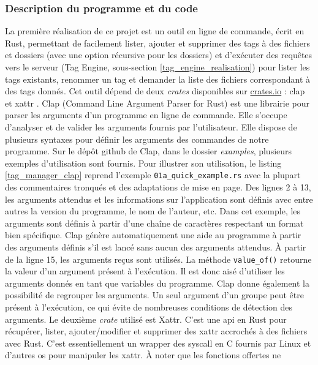 \documentclass[a4paper, 12pt]{article}
\begin{document}
\subsubsection{Description du programme et du code}
La première réalisation de ce projet est un outil en ligne de commande, écrit en Rust, permettant 
de facilement lister, ajouter et supprimer des tags à des fichiers et dossiers (avec une option 
récursive pour les dossiers) et d'exécuter des requêtes vers le serveur (Tag Engine, sous-section 
\ref{tag_engine_realisation}) pour lister 
les tags existants, renommer un tag et demander la liste des fichiers correspondant à des tags 
donnés. Cet outil dépend de deux \textit{crates} disponibles sur \href{https://crates.io}{crates.io} 
: clap \cite{ref22} et xattr \cite{ref23}.
\bigbreak
Clap (Command Line Argument Parser for Rust) est une 
librairie pour parser les arguments d'un programme en ligne de commande. Elle s'occupe d'analyser 
et de valider les arguments fournis par l'utilisateur. Elle dispose de plusieurs syntaxes pour 
définir les arguments des commandes de notre programme. Sur le dépôt github de Clap, dans le 
dossier \textit{examples}, plusieurs exemples d'utilisation sont fournis. Pour illustrer son 
utilisation, le listing \ref{tag_manager_clap} reprend l'exemple \texttt{01a_quick_example.rs} 
avec la plupart des commentaires tronqués et des adaptations de mise en page. Des lignes 2 à 13, 
les arguments attendus et les informations sur l'application sont définis avec entre autres la 
version du programme, le nom de l'auteur, etc. Dans cet exemple, les arguments sont définis à 
partir d'une chaîne de caractères respectant un format bien spécifique. Clap génère automatiquement 
une aide au programme à partir des arguments définis s'il est lancé sans aucun des arguments attendus.
À partir de la ligne 15, les arguments reçus sont utilisés. La méthode \texttt{value_of()} 
retourne la valeur d'un argument présent à l'exécution. Il est donc aisé d'utiliser les arguments 
donnés en tant que variables du programme. Clap donne également la possibilité de regrouper les 
arguments. Un seul argument d'un groupe peut être présent à l'exécution, ce qui évite de nombreuses 
conditions de détection des arguments.
\bigbreak
Le deuxième \textit{crate} utilisé est Xattr. C'est une \acrshort{api} 
en Rust pour récupérer, lister, ajouter/modifier et supprimer des \acrshort{xattr} accrochés à des 
fichiers avec Rust. C'est essentiellement un wrapper des \acrshort{syscall} en C fournis par Linux 
et d'autres \acrshort{os} pour manipuler les \acrshort{xattr}. À noter que les fonctions offertes ne 
\end{document}
